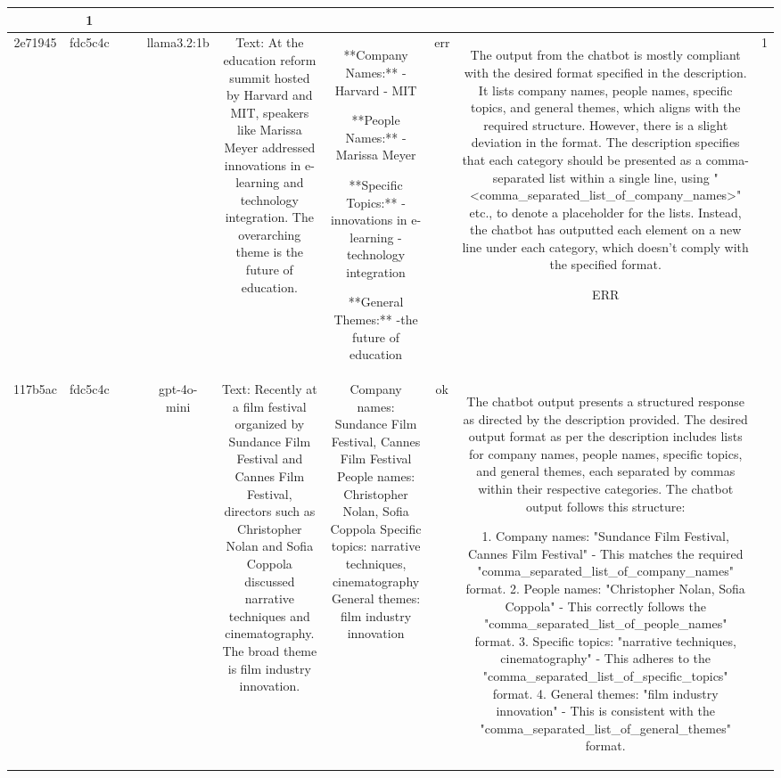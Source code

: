 \begin{table}[h!]
\begin{tabular}{|c|c|c|c|c|c|c|c|c|c|}
{ERR & 1\\
\hline
2e71945 & fdc5c4c &  &  & llama3.2:1b & Text: At the education reform summit hosted by Harvard and MIT, speakers like Marissa Meyer addressed innovations in e-learning and technology integration. The overarching theme is the future of education. & **Company Names:** 
- Harvard
- MIT

**People Names:**
-Marissa Meyer

**Specific Topics:**
-innovations in e-learning
-technology integration

**General Themes:**
-the future of education & err & The output from the chatbot is mostly compliant with the desired format specified in the description. It lists company names, people names, specific topics, and general themes, which aligns with the required structure. However, there is a slight deviation in the format. The description specifies that each category should be presented as a comma-separated list within a single line, using "<comma_separated_list_of_company_names>" etc., to denote a placeholder for the lists. Instead, the chatbot has outputted each element on a new line under each category, which doesn't comply with the specified format.

ERR & 1\\
\hline
117b5ac & fdc5c4c &  &  & gpt-4o-mini & Text: Recently at a film festival organized by Sundance Film Festival and Cannes Film Festival, directors such as Christopher Nolan and Sofia Coppola discussed narrative techniques and cinematography. The broad theme is film industry innovation. & Company names: Sundance Film Festival, Cannes Film Festival  
People names: Christopher Nolan, Sofia Coppola  
Specific topics: narrative techniques, cinematography  
General themes: film industry innovation & ok & The chatbot output presents a structured response as directed by the description provided. The desired output format as per the description includes lists for company names, people names, specific topics, and general themes, each separated by commas within their respective categories. The chatbot output follows this structure:

1. Company names: "Sundance Film Festival, Cannes Film Festival" - This matches the required "comma_separated_list_of_company_names" format.
2. People names: "Christopher Nolan, Sofia Coppola" - This correctly follows the "comma_separated_list_of_people_names" format.
3. Specific topics: "narrative techniques, cinematography" - This adheres to the "comma_separated_list_of_specific_topics" format.
4. General themes: "film industry innovation" - This is consistent with the "comma_separated_list_of_general_themes" format.

}
\end{tabular}
\end{table}

